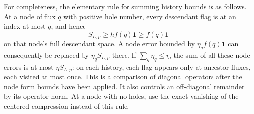 For completeness, the elementary rule for summing history bounds is
as follows.  At a node of flux $q$ with positive hole number, every
descendant flag is at an index at most $q$, and hence
\begin{equation}\label{eq:charge-node-lower-bound}
 S_{L,p}\ge h f(q)\mathbf1\ge f(q)\mathbf1
\end{equation}
on that node's full descendant space.  A node error bounded by
$\eta_q f(q)\mathbf1$ can consequently be replaced by
$\eta_q S_{L,p}$ there.  If $\sum_q\eta_q\le\eta$, the sum of all
these node errors is at most $\eta S_{L,p}$: on each history, each
flag appears only at ancestor fluxes, each visited at most once.
This is a comparison of diagonal operators after the node form
bounds have been applied.  It also controls an off-diagonal
remainder by its operator norm.  At a node with no holes, use the
exact vanishing of the centered compression instead of this rule.


